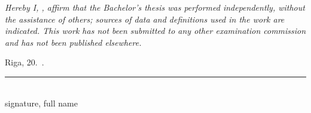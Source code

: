 \frontmatterpage
{}

\textit{Hereby I, \studentnameEN, affirm that the Bachelor's thesis was performed independently, without the assistance of others; sources of data and definitions used in the work are indicated. This work has not been submitted to any other examination commission and has not been published elsewhere.}

\vspace{14mm}
\noindent Riga, 20\underline{\hspace{1cm}}.\ \underline{\hspace{2.5cm}}.\hspace{1cm}\rule{5cm}{0.4pt}\\
\hspace*{7.1cm}\scriptsize signature, full name \hfill
